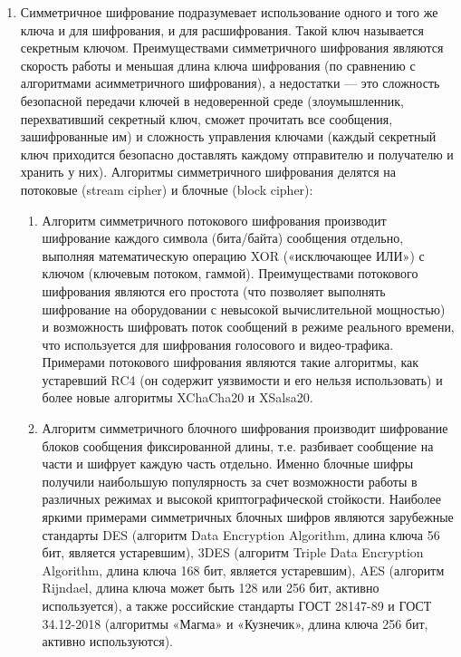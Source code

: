\begin{enumerate}
    \item Симметричное шифрование подразумевает использование одного и того же
        ключа и для шифрования, и для расшифрования. Такой ключ называется
        секретным ключом. Преимуществами симметричного шифрования являются
        скорость работы и меньшая длина ключа шифрования (по сравнению с
        алгоритмами асимметричного шифрования), а недостатки — это сложность
        безопасной передачи ключей в недоверенной среде (злоумышленник,
        перехвативший секретный ключ, сможет прочитать все сообщения,
        зашифрованные им) и сложность управления ключами (каждый секретный ключ
        приходится безопасно доставлять каждому отправителю и получателю и
        хранить у них). Алгоритмы симметричного шифрования делятся на потоковые
        (stream cipher) и блочные (block cipher):

    \begin{enumerate}
        \item Алгоритм симметричного потокового шифрования производит
            шифрование каждого символа (бита/байта) сообщения отдельно,
            выполняя математическую операцию XOR («исключающее ИЛИ») с ключом
            (ключевым потоком, гаммой). Преимуществами потокового шифрования
            являются его простота (что позволяет выполнять шифрование на
            оборудовании с невысокой вычислительной мощностью) и возможность
            шифровать поток сообщений в режиме реального времени, что
            используется для шифрования голосового и видео-трафика. Примерами
            потокового шифрования являются такие алгоритмы, как устаревший RC4
            (он содержит уязвимости и его нельзя использовать) и более новые
            алгоритмы XChaCha20 и XSalsa20.

        \item Алгоритм симметричного блочного шифрования производит шифрование
            блоков сообщения фиксированной длины, т.е. разбивает сообщение на
            части и шифрует каждую часть отдельно. Именно блочные шифры
            получили наибольшую популярность за счет возможности работы в
            различных режимах и высокой криптографической стойкости. Наиболее
            яркими примерами симметричных блочных шифров являются зарубежные
            стандарты DES (алгоритм Data Encryption Algorithm, длина ключа 56
            бит, является устаревшим), 3DES (алгоритм Triple Data Encryption
            Algorithm, длина ключа 168 бит, является устаревшим), AES (алгоритм
            Rijndael, длина ключа может быть 128 или 256 бит, активно
            используется), а также российские стандарты ГОСТ 28147-89 и ГОСТ
            34.12-2018 (алгоритмы «Магма» и «Кузнечик», длина ключа 256 бит,
            активно используются).
    \end{enumerate}


\end{enumerate}
